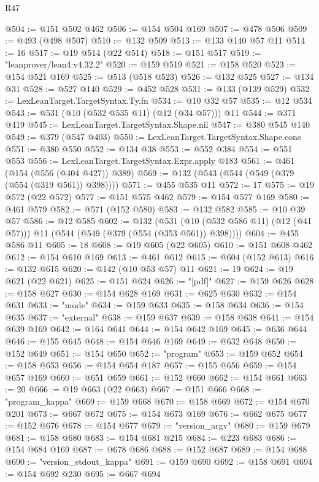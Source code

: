\begin{lexlean}{R47}
\begin{coremodule}
@504 := @151 @502 @462
@506 := @154 @504 @169
@507 := @478 @506
@509 := @493 (@498 @507)
@510 := @132 @509
@513 := @133 @140 @57 @11
@514 := 16
@517 := @19 @514 (@22 @514)
@518 := @151 @517
@519 := "leanprover/lean4:v4.32.2"
@520 := @159 @519
@521 := @158 @520
@523 := @154 @521 @169
@525 := @513 (@518 @523)
@526 := @132 @525
@527 := @134 @31
@528 := @527 @140
@529 := @452 @528
@531 := @133 (@139 @529)
@532 := LexLeanTarget.TargetSyntax.Ty.fn
@534 := @10 @32 @57
@535 := @12 @534
@543 := @531 (@10 (@532 @535 @11) (@12 (@34 @57))) @11
@544 := @371 @419
@545 := LexLeanTarget.TargetSyntax.Shape.nil
@547 := @380 @545 @140
@549 := @379 (@547 @403)
@550 := LexLeanTarget.TargetSyntax.Shape.cons
@551 := @380 @550
@552 := @134 @38
@553 := @552 @384
@554 := @551 @553
@556 := LexLeanTarget.TargetSyntax.Expr.apply @183
@561 := @461 (@154 (@556 (@404 @427)) @389)
@569 := @132 (@543 (@544 (@549 (@379 (@554 (@319 @561)) @398))))
@571 := @455 @535 @11
@572 := 17
@575 := @19 @572 (@22 @572)
@577 := @151 @575 @462
@579 := @154 @577 @169
@580 := @461 @579
@582 := @571 (@152 @580)
@583 := @132 @582
@585 := @10 @39 @57
@586 := @12 @585
@602 := @132
    (@531 (@10 (@532 @586 @11) (@12 (@41 @57))) @11 (@544 (@549 (@379 (@554 (@353 @561)) @398))))
@604 := @455 @586 @11
@605 := 18
@608 := @19 @605 (@22 @605)
@610 := @151 @608 @462
@612 := @154 @610 @169
@613 := @461 @612
@615 := @604 (@152 @613)
@616 := @132 @615
@620 := @142 (@10 @53 @57) @11
@621 := 19
@624 := @19 @621 (@22 @621)
@625 := @151 @624
@626 := "[pdf]"
@627 := @159 @626
@628 := @158 @627
@630 := @154 @628 @169
@631 := @625 @630
@632 := @154 @631
@633 := "mode"
@634 := @159 @633
@635 := @158 @634
@636 := @154 @635
@637 := "external"
@638 := @159 @637
@639 := @158 @638
@641 := @154 @639 @169
@642 := @164 @641
@644 := @154 @642 @169
@645 := @636 @644
@646 := @155 @645
@648 := @154 @646 @169
@649 := @632 @648
@650 := @152 @649
@651 := @154 @650
@652 := "program"
@653 := @159 @652
@654 := @158 @653
@656 := @154 @654 @187
@657 := @155 @656
@659 := @154 @657 @169
@660 := @651 @659
@661 := @152 @660
@662 := @154 @661
@663 := 20
@666 := @19 @663 (@22 @663)
@667 := @151 @666
@668 := "program_kappa"
@669 := @159 @668
@670 := @158 @669
@672 := @154 @670 @201
@673 := @667 @672
@675 := @154 @673 @169
@676 := @662 @675
@677 := @152 @676
@678 := @154 @677
@679 := "version_argv"
@680 := @159 @679
@681 := @158 @680
@683 := @154 @681 @215
@684 := @223 @683
@686 := @154 @684 @169
@687 := @678 @686
@688 := @152 @687
@689 := @154 @688
@690 := "version_stdout_kappa"
@691 := @159 @690
@692 := @158 @691
@694 := @154 @692 @230
@695 := @667 @694

\end{coremodule}
\end{lexlean}
